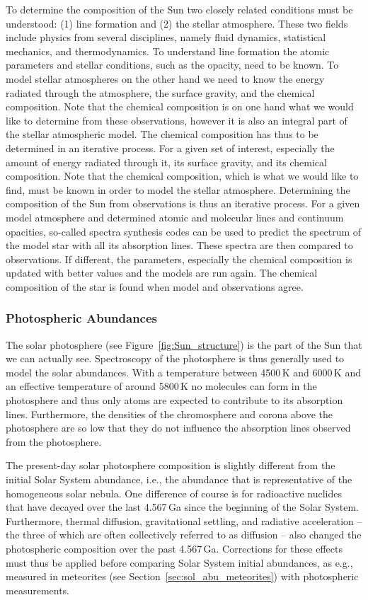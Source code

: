 To determine the composition of the Sun two closely related conditions must be understood: (1) line formation and (2) the stellar atmosphere. These two fields include physics from several disciplines, namely fluid dynamics, statistical mechanics, and thermodynamics. To understand line formation the atomic parameters and stellar conditions, such as the opacity, need to be known. To model stellar atmospheres on the other hand we need to know the energy radiated through the atmosphere, the surface gravity, and the chemical composition. Note that the chemical composition is on one hand what we would like to determine from these observations, however it is also an integral part of the stellar atmospheric model. The chemical composition has thus to be determined in an iterative process. For a given set of interest, especially the amount of energy radiated through it, its surface gravity, and its chemical composition. Note that the chemical composition, which is what we would like to find, must be known in order to model the stellar atmosphere. Determining the composition of the Sun from observations is thus an iterative process. For a given model atmosphere and determined atomic and molecular lines and continuum opacities, so-called spectra synthesis codes can be used to predict the spectrum of the model star with all its absorption lines. These spectra are then compared to observations. If different, the parameters, especially the chemical composition is updated with better values and the models are run again. The chemical composition of the star is found when model and observations agree.




\subsubsection{Photospheric Abundances}

The solar photosphere (see Figure~\ref{fig:Sun_structure}) is the part of the Sun that we can actually see. Spectroscopy of the photosphere is thus generally used to model the solar abundances. With a temperature between 4500\,K and 6000\,K and an effective temperature of around 5800\,K no molecules can form in the photosphere and thus only atoms are expected to contribute to its absorption lines. Furthermore, the densities of the chromosphere and corona above the photosphere are so low that they do not influence the absorption lines observed from the photosphere.

The present-day solar photosphere composition is slightly different from the initial Solar System abundance, i.e., the abundance that is representative of the homogeneous solar nebula. One difference of course is for radioactive nuclides that have decayed over the last 4.567\,Ga since the beginning of the Solar System. Furthermore, thermal diffusion, gravitational settling, and radiative acceleration -- the three of which are often collectively referred to as diffusion -- also changed the photospheric composition over the past 4.567\,Ga. Corrections for these effects must thus be applied before comparing Solar System initial abundances, as e.g., measured in meteorites (see Section~\ref{sec:sol_abu_meteorites}) with photospheric measurements.

